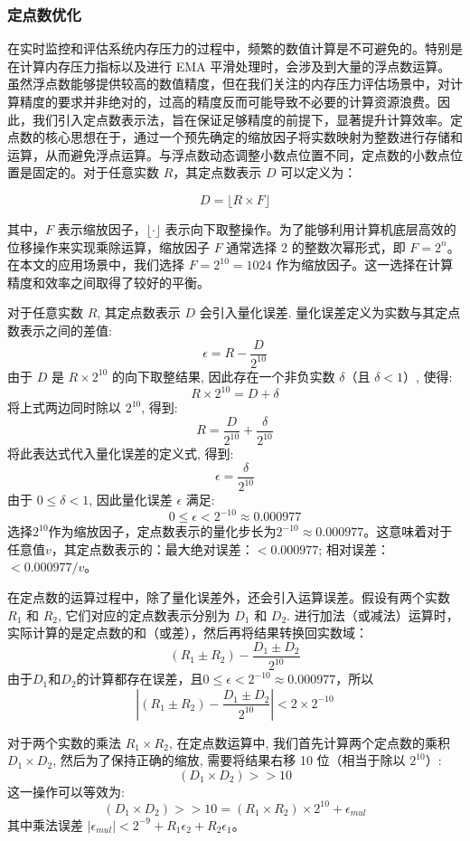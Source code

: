 \subsubsection{定点数优化}
\label{sec:fixed_point_optimization}

在实时监控和评估系统内存压力的过程中，频繁的数值计算是不可避免的。特别是在计算内存压力指标以及进行 EMA 平滑处理时，会涉及到大量的浮点数运算。虽然浮点数能够提供较高的数值精度，但在我们关注的内存压力评估场景中，对计算精度的要求并非绝对的，过高的精度反而可能导致不必要的计算资源浪费。因此，我们引入定点数表示法，旨在保证足够精度的前提下，显著提升计算效率。定点数的核心思想在于，通过一个预先确定的缩放因子将实数映射为整数进行存储和运算，从而避免浮点运算。与浮点数动态调整小数点位置不同，定点数的小数点位置是固定的。对于任意实数 \(R\)，其定点数表示 \(D\) 可以定义为：

\[
D = \lfloor R \times F \rfloor
\]

其中，\(F\) 表示缩放因子，\(\lfloor \cdot \rfloor\) 表示向下取整操作。为了能够利用计算机底层高效的位移操作来实现乘除运算，缩放因子 \(F\) 通常选择 2 的整数次幂形式，即 \(F = 2^n\)。在本文的应用场景中，我们选择 \(F = 2^{10} = 1024\) 作为缩放因子。这一选择在计算精度和效率之间取得了较好的平衡。

对于任意实数 \(R\), 其定点数表示 \(D\) 会引入量化误差. 量化误差定义为实数与其定点数表示之间的差值:
\[
\epsilon = R - \frac{D}{2^{10}}
\]
由于 \(D\) 是 \(R \times 2^{10}\) 的向下取整结果, 因此存在一个非负实数 \(\delta\)（且 \(\delta < 1\)）, 使得:
\[
R \times 2^{10} = D + \delta
\]
将上式两边同时除以 \(2^{10}\), 得到:
\[
R = \frac{D}{2^{10}} + \frac{\delta}{2^{10}}
\]
将此表达式代入量化误差的定义式, 得到:
\[
\epsilon = \frac{\delta}{2^{10}}
\]
由于 \(0 \leq \delta < 1\), 因此量化误差 \(\epsilon\) 满足:
\[
0 \leq \epsilon < 2^{-10} \approx 0.000977
\]
选择\(2^{10}\)作为缩放因子，定点数表示的量化步长为\(2^{-10} \approx 0.000977\)。这意味着对于任意值\(v\)，其定点数表示的：最大绝对误差：\(< 0.000977\); 相对误差：\(< 0.000977/v\)。

在定点数的运算过程中，除了量化误差外，还会引入运算误差。假设有两个实数 \(R_1\) 和 \(R_2\), 它们对应的定点数表示分别为 \(D_1\) 和 \(D_2\). 进行加法（或减法）运算时，实际计算的是定点数的和（或差），然后再将结果转换回实数域：
\[
(R_1 \pm R_2) - \frac{D_1 \pm D_2}{2^{10}}
\]
由于\(D_1\)和\(D_2\)的计算都存在误差，且\(0 \leq \epsilon < 2^{-10} \approx 0.000977\)，所以
\[
|(R_1 \pm R_2) - \frac{D_1 \pm D_2}{2^{10}}| < 2 \times 2^{-10}
\]

对于两个实数的乘法 \(R_1 \times R_2\), 在定点数运算中, 我们首先计算两个定点数的乘积 \(D_1 \times D_2\), 然后为了保持正确的缩放, 需要将结果右移 10 位（相当于除以 \(2^{10}\)）:
\[
(D_1 \times D_2) >> 10
\]
这一操作可以等效为:
\[
(D_1 \times D_2) >> 10 = (R_1 \times R_2) \times 2^{10} + \epsilon_{mul}
\]
其中乘法误差 \(|\epsilon_{mul}| < 2^{-9} + R_1\epsilon_2 + R_2\epsilon_1\)。

